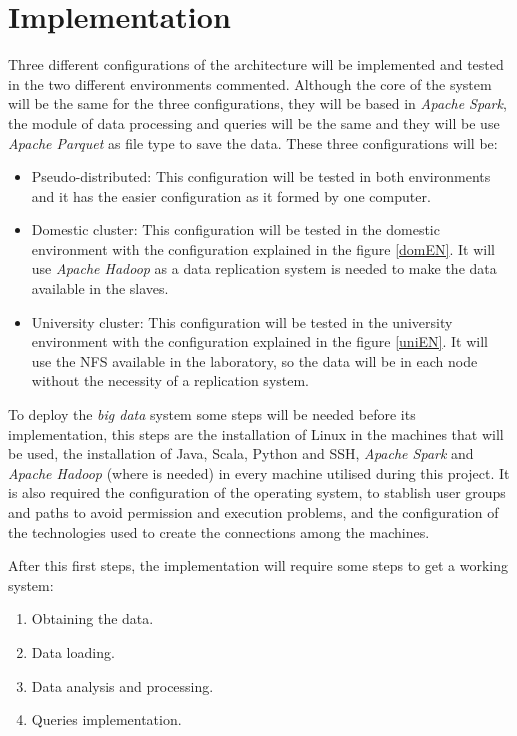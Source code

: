 \section{Implementation}
Three different configurations of the architecture will be implemented and tested in the two different environments commented. Although the core of the system will be the same for the three configurations, they will be based in \textit{Apache Spark}, the module of data processing and queries will be the same and they will be use \textit{Apache Parquet} as file type to save the data. These three configurations will be:

\begin{itemize}
\item Pseudo-distributed: This configuration will be tested in both environments and it has the easier configuration as it formed by one computer.
\item Domestic cluster: This configuration will be tested in the domestic environment with the configuration explained in the figure \ref{domEN}. It will use \textit{Apache Hadoop} as a data replication system is needed to make the data available in the slaves.
\item University cluster: This configuration will be tested in the university environment with the configuration explained in the figure \ref{uniEN}. It will use the \gls{NFS} available in the laboratory, so the data will be in each node without the necessity of a replication system.
\end{itemize}

To deploy the \textit{big data} system some steps will be needed before its implementation, this steps are the installation of Linux in the machines that will be used, the installation of Java, Scala, Python and \gls{SSH}, \textit{Apache Spark} and \textit{Apache Hadoop} (where is needed) in every machine utilised during this project. It is also required the configuration of the operating system, to stablish user groups and paths to avoid permission and execution problems, and the configuration of the technologies used to create the connections among the machines.

After this first steps, the implementation will require some steps to get a working system:

\begin{enumerate}
\item Obtaining the data.
\item Data loading.
\item Data analysis and processing.
\item Queries implementation.
\end{enumerate}

